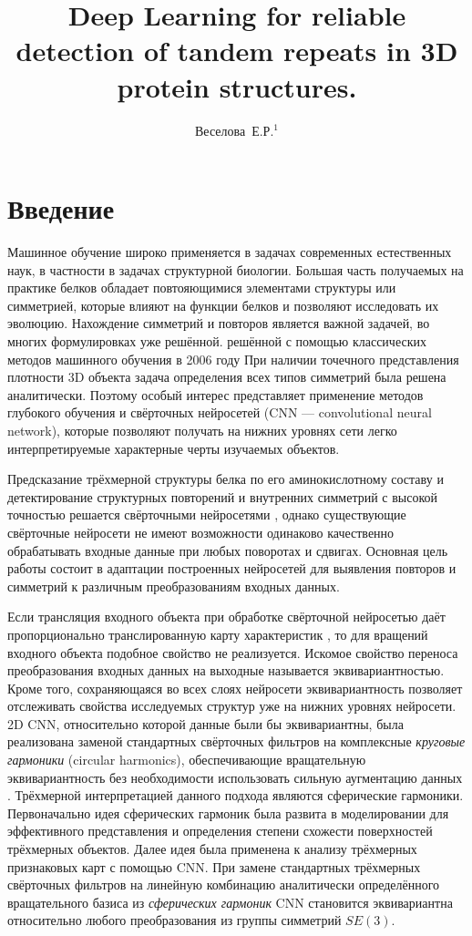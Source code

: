 \documentclass[12pt,twosides]{article}
\title
[Detection of tandem repeats in proteins]
{Deep Learning for reliable detection of tandem repeats in 3D protein structures.}
\author
[Веселова~Е.Р.] 
{Веселова~Е.Р.$^1$}
\begin{document}
	\maketitle
	
	\section{Введение}
	Машинное обучение широко применяется в задачах современных естественных наук, в частности в задачах структурной биологии. Большая часть получаемых на практике белков обладает повтояющимися элементами структуры или симметрией, которые влияют на функции белков и позволяют исследовать их эволюцию. Нахождение симметрий и повторов является важной задачей, во многих формулировках уже решённой. решённой с помощью классических методов машинного обучения в 2006 году \cite{MitGuiPau06}
	При наличии точечного представления плотности 3D объекта задача определения всех типов симметрий была решена аналитически.
	Поэтому особый интерес представляет применение методов глубокого обучения и свёрточных нейросетей (CNN --- convolutional neural network), которые позволяют получать на нижних уровнях сети легко интерпретируемые характерные черты изучаемых объектов. 
	
	Предсказание трёхмерной структуры белка по его аминокислотному составу \cite{BioCNN18} и детектирование структурных повторений и внутренних симметрий с высокой точностью решается свёрточными нейросетями \cite{DeepSymmetry18}, однако существующие свёрточные нейросети не имеют возможности одинаково качественно обрабатывать входные данные при любых поворотах и сдвигах. Основная цель работы состоит в адаптации построенных нейросетей для выявления повторов и симметрий к различным преобразованиям входных данных. 
	
	Если трансляция входного объекта при обработке свёрточной нейросетью даёт пропорционально транслированную карту характеристик \cite{Lenc18}, то для вращений входного объекта подобное свойство не реализуется. Искомое свойство переноса преобразования входных данных на выходные называется эквивариантностью. Кроме того, сохраняющаяся во всех слоях нейросети эквивариантность позволяет отслеживать свойства исследуемых структур уже на нижних уровнях нейросети. 2D CNN, относительно которой данные были бы эквивариантны, была реализована заменой стандартных свёрточных фильтров на комплексные \textit{круговые гармоники} (circular harmonics), обеспечивающие вращательную эквивариантность без необходимости использовать сильную аугментацию данных \cite{conf/cvpr/WorrallGTB17}. Трёхмерной интерпретацией данного подхода являются сферические гармоники. Первоначально идея сферических гармоник была развита в моделировании для эффективного представления и определения степени схожести поверхностей трёхмерных объектов\cite{conf/siggraph/KazhdanF02, journals/cagd/MousaCAG08}. Далее идея была применена к анализу трёхмерных признаковых карт с помощью CNN. При замене стандартных трёхмерных свёрточных фильтров на линейную комбинацию аналитически определённого вращательного базиса из \textit{сферических гармоник} CNN становится эквивариантна относительно любого преобразования из группы симметрий $SE(3)$\cite{DBLP:journals/corr/abs-1807-02547}.
	
\end{document}
